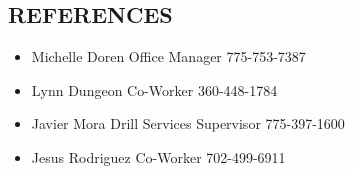 \documentclass[margin, 10pt]{res} %
\begin{document}
\begin{resume}

\section{REFERENCES} 
\begin{itemize} 
\item Michelle Doren Office Manager 775-753-7387 
\item Lynn Dungeon Co-Worker 360-448-1784 
\item Javier Mora Drill Services Supervisor 775-397-1600
\item Jesus Rodriguez Co-Worker 702-499-6911
\end{itemize} 


\end{resume}
\end{document}
